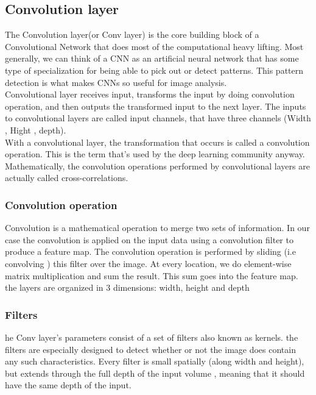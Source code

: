 \subsection{Convolution layer}
The Convolution layer(or Conv layer) is the core building block of a Convolutional
Network that does most of the computational heavy lifting. Most generally, we can think
of a CNN as an artificial neural network that has some type of specialization for being
able to pick out or detect patterns. This pattern detection is what makes CNNs so useful
for image analysis. \vspace{4mm} \\
Convolutional layer receives input, transforms the input by doing convolution operation,
and then outputs the transformed input to the next layer.
The inputs to convolutional layers are called input channels, that have three channels
(Width , Hight , depth). \vspace{4mm} \\
With a convolutional layer, the transformation that occurs is called a convolution
operation. This is the term that’s used by the deep learning community anyway. Mathematically,
the convolution operations performed by convolutional layers are actually
called cross-correlations. \cite{art20}

\subsubsection{Convolution operation}
Convolution is a mathematical operation to merge two sets of information. In our
case the convolution is applied on the input data using a convolution filter to produce a
feature map. The convolution operation is performed by sliding (i.e convolving ) this filter
over the image. At every location, we do element-wise matrix multiplication and sum
the result. This sum goes into the feature map. the layers are organized in 3 dimensions:
width, height and depth
\subsubsection{Filters}
he Conv layer’s parameters consist of a set of filters also known as kernels. the
filters are especially designed to detect whether or not the image does contain any such
characteristics. Every filter is small spatially (along width and height), but extends
through the full depth of the input volume , meaning that it should have the same depth
of the input.
